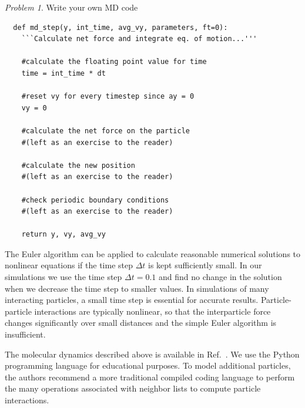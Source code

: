 \documentclass[preprint,showpacs,preprintnumbers,amsmath,amssymb,aps,prb]{revtex4-1}
\theoremstyle{remark}
\newtheorem{problem}{Problem}
\begin{document}
\begin{problem}{Write your own MD code}
\begin{enumerate}
\begin{verbatim}
  def md_step(y, int_time, avg_vy, parameters, ft=0):
    ```Calculate net force and integrate eq. of motion...'''

    #calculate the floating point value for time
    time = int_time * dt

    #reset vy for every timestep since ay = 0 
    vy = 0 

    #calculate the net force on the particle
    #(left as an exercise to the reader)

    #calculate the new position
    #(left as an exercise to the reader)

    #check periodic boundary conditions
    #(left as an exercise to the reader)

    return y, vy, avg_vy

\end{verbatim}

    
  \end{enumerate}

  The Euler algorithm can be applied to
  calculate reasonable numerical solutions to 
  nonlinear
  equations if the time step $\Delta t$
  is kept sufficiently small.\cite{Newman}
  In our simulations we use the time step $\Delta t = 0.1$
  and find no change in the solution
  when we decrease the time step to smaller values.
  In simulations of
  many interacting particles,
  a small
  time step is essential for accurate results.
  Particle-particle interactions are typically nonlinear,
  so that the interparticle force changes significantly over small distances and the simple Euler algorithm is insufficient.

  The molecular dynamics
  described above
  is available in Ref.~\cite{supplemental}.
  We use the Python programming
  language
  for educational purposes.
  To model additional particles,
  the authors recommend a more traditional 
  compiled coding language
  to perform the many operations associated
  with neighbor lists to compute particle interactions.
  
\end{problem}
\end{document}
